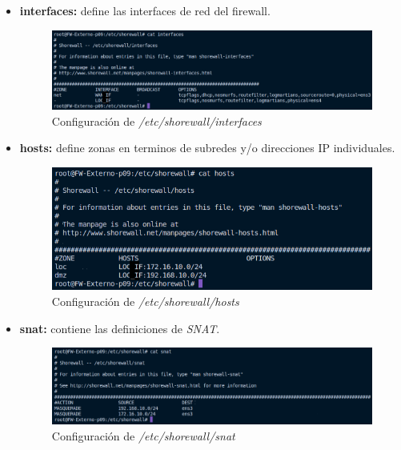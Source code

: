 \documentclass[11pt]{report}
\begin{document}
\begin{itemize}
  \item \textbf{interfaces:} define las interfaces de red del firewall.
  \begin{figure}[H]
    \centering
    \includegraphics[scale=0.65]{img/interfaces.png}
    \caption{Configuración de \emph{/etc/shorewall/interfaces}}
    \label{fig:Configuracion de /etc/shorewall/interfaces}
  \end{figure}
  \item \textbf{hosts:} define zonas en terminos de subredes y/o direcciones IP individuales.
  \begin{figure}[H]
    \centering
    \includegraphics[scale=0.7]{img/hosts.png}
    \caption{Configuración de \emph{/etc/shorewall/hosts}}
    \label{fig:Configuracion de /etc/shorewall/hosts}
  \end{figure}
  \item \textbf{snat:} contiene las definiciones de \emph{SNAT}. 
  \begin{figure}[H]
    \centering
    \includegraphics[scale=0.65]{img/snat_config.png}
    \caption{Configuración de \emph{/etc/shorewall/snat}}
    \label{fig:Configuracion de /etc/shorewall/snat}
  \end{figure}
\end{itemize}

\cleardoublepage
\end{document}
